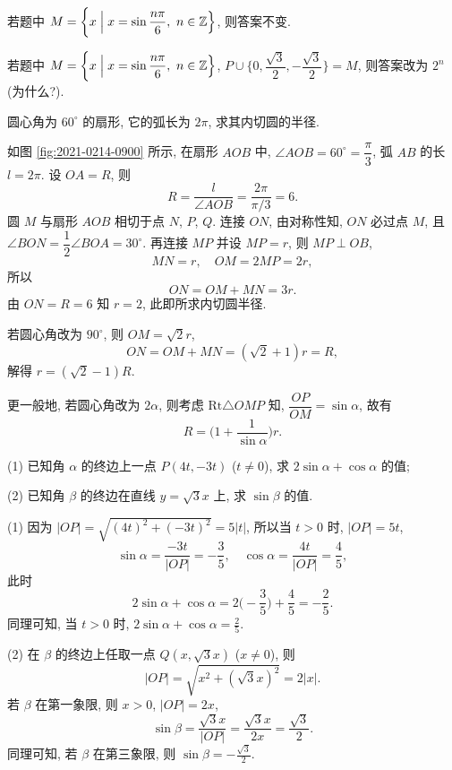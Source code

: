     \varexercise 若题中 $M=\biggl\{x\Bigm| x=\sin\dfrac{n\pi}6,\ n\in\mathbb{Z}\Big\}$, 则答案不变.

    \varexercise 若题中 $M=\biggl\{x\Bigm| x=\sin\dfrac{n\pi}6,\ n\in\mathbb{Z}\Big\}$, $P\cup\biggl\{0, \dfrac{\sqrt3}2, -\dfrac{\sqrt3}2\biggr\}=M$, 则答案改为 $2^n$ (为什么?).
\endsolution

\begin{exercise}
    圆心角为 $60^\circ$ 的扇形, 它的弧长为 $2\pi$, 求其内切圆的半径.
\end{exercise}
\beginsolution
    如图 \ref{fig:2021-0214-0900} 所示, 在扇形 $AOB$ 中,
    $\angle AOB= 60^\circ= \dfrac{\pi}3$, 弧 $AB$ 的长 $l=2\pi$. 设 $OA=R$, 则
    \[R=\frac{l}{\angle AOB}= \frac{2\pi}{\pi/3}= 6.\]
    圆 $M$ 与扇形 $AOB$ 相切于点 $N$, $P$, $Q$. 连接 $ON$, 由对称性知, $ON$ 必过点 $M$, 且 $\angle BON= \dfrac12\angle BOA= 30^\circ$. 再连接 $MP$ 并设 $MP=r$, 则 $MP\perp OB$,
    \[MN=r,\quad OM= 2MP= 2r,\]
    所以
    \[ON= OM+MN= 3r.\]
    由 $ON= R= 6$ 知 $r=2$, 此即所求内切圆半径.

    \varexercise 若圆心角改为 $90^\circ$, 则 $OM=\sqrt2 r$,
    \[ON= OM+MN= (\sqrt2+1)r= R,\]
    解得 $r= (\sqrt2-1)R$.

    \varexercise 更一般地, 若圆心角改为 $2\alpha$, 则考虑 $\mathrm{Rt}\triangle OMP$ 知, $\dfrac{OP}{OM}= \sin\alpha$, 故有
    \[R=\biggl(1+\dfrac1{\sin\alpha}\biggr)r.\]
\endsolution

\begin{exercise}
    (1) 已知角 $\alpha$ 的终边上一点 $P(4t,-3t)$ ($t\neq0$),
    求 $2\sin\alpha +\cos\alpha$ 的值;
  
    (2) 已知角 $\beta$ 的终边在直线 $y=\sqrt3x$ 上, 求 $\sin\beta$ 的值.
\end{exercise}
\beginsolution
    (1) 因为 $|OP|=\sqrt{(4t)^2+(-3t)^2}= 5|t|$, 所以当 $t>0$ 时, $|OP|= 5t$,
    \[\sin\alpha= \frac{-3t}{|OP|}= -\frac35,\quad
        \cos\alpha= \frac{4t}{|OP|}= \frac45,\]
    此时
    \[2\sin\alpha +\cos\alpha
        = 2\biggl(-\frac35\biggr)+ \frac45
        = -\frac25.\]
    同理可知, 当 $t>0$ 时, $2\sin\alpha +\cos\alpha= \frac25$.

    (2) 在 $\beta$ 的终边上任取一点 $Q(x,\sqrt3x)$ ($x\neq0$), 则
    \[|OP|=\sqrt{x^2+(\sqrt3x)^2}= 2|x|.\]
    若 $\beta$ 在第一象限, 则 $x>0$, $|OP|= 2x$,
    \[\sin\beta= \frac{\sqrt3x}{|OP|}
        = \frac{\sqrt3x}{2x}= \frac{\sqrt{3}}2.\]
    同理可知, 若 $\beta$ 在第三象限, 则 $\sin\beta=-\frac{\sqrt{3}}2$.
\endsolution